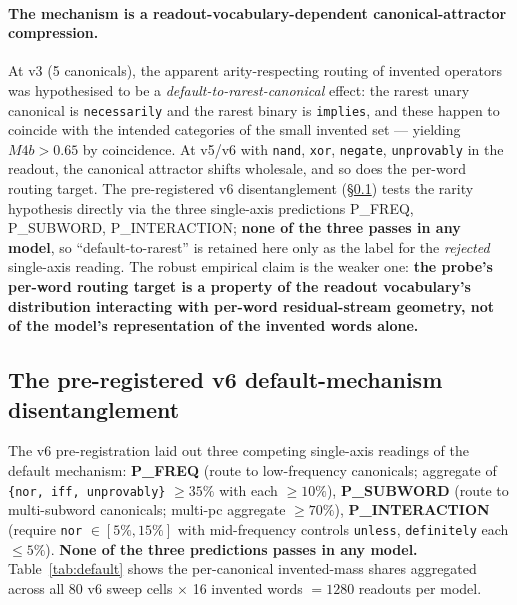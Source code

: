 \documentclass[11pt,letterpaper]{article}
\newcommand{\Mbfb}{M4b}
\begin{document}
\paragraph{The mechanism is a readout-vocabulary-dependent
canonical-attractor compression.} At v3 (5 canonicals), the
apparent arity-respecting routing of invented operators was
hypothesised to be a \emph{default-to-rarest-canonical} effect: the
rarest unary canonical is \texttt{necessarily} and the rarest binary
is \texttt{implies}, and these happen to coincide with the intended
categories of the small invented set --- yielding $\Mbfb > 0.65$ by
coincidence. At v5/v6 with \texttt{nand}, \texttt{xor},
\texttt{negate}, \texttt{unprovably} in the readout, the canonical
attractor shifts wholesale, and so does the per-word routing target.
The pre-registered v6 disentanglement (\S\ref{sec:default}) tests the
rarity hypothesis directly via the three single-axis predictions
P\_FREQ, P\_SUBWORD, P\_INTERACTION; \textbf{none of the three passes
in any model}, so ``default-to-rarest'' is retained here only as the
label for the \emph{rejected} single-axis reading. The robust
empirical claim is the weaker one: \textbf{the probe's per-word
routing target is a property of the readout vocabulary's distribution
interacting with per-word residual-stream geometry, not of the
model's representation of the invented words alone.}

\subsection{The pre-registered v6 default-mechanism disentanglement}
\label{sec:default}

The v6 pre-registration laid out three competing single-axis
readings of the default mechanism: \textbf{P\_FREQ} (route to
low-frequency canonicals; aggregate of \texttt{\{nor, iff,
unprovably\}} $\geq 35\%$ with each $\geq 10\%$), \textbf{P\_SUBWORD}
(route to multi-subword canonicals; multi-pc aggregate $\geq 70\%$),
\textbf{P\_INTERACTION} (require \texttt{nor} $\in [5\%, 15\%]$ with
mid-frequency controls \texttt{unless}, \texttt{definitely} each
$\leq 5\%$). \textbf{None of the three predictions passes in any
model.} Table~\ref{tab:default} shows the per-canonical
invented-mass shares aggregated across all 80 v6 sweep cells
$\times$ 16 invented words $= 1280$ readouts per model.
\end{document}
